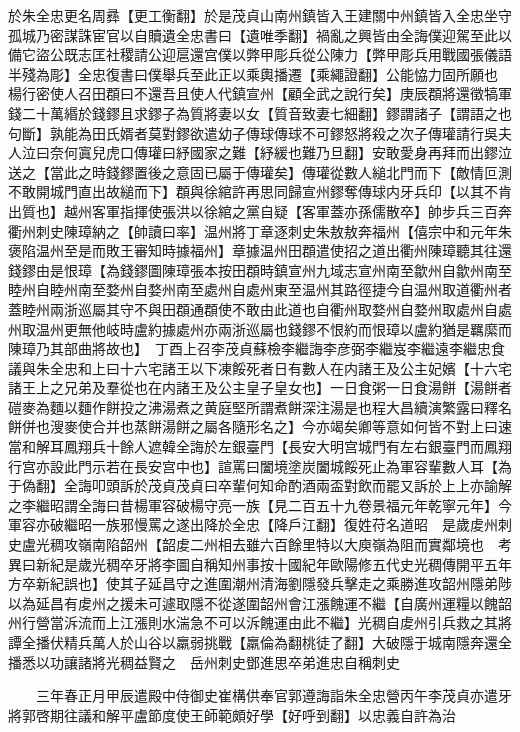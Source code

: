 於朱全忠更名周彞【更工衡翻】於是茂貞山南州鎮皆入王建關中州鎮皆入全忠坐守孤城乃密謀誅宦官以自贖遺全忠書曰【遺唯季翻】禍亂之興皆由全誨僕迎駕至此以備它盜公既志匡社稷請公迎扈還宫僕以弊甲彫兵從公陳力【弊甲彫兵用戰國張儀語半殘為彫】全忠復書曰僕舉兵至此正以乘輿播遷【乘繩證翻】公能恊力固所願也　楊行密使人召田頵曰不還吾且使人代鎮宣州【顧全武之說行矣】庚辰頵將還徵犒軍錢二十萬緡於錢鏐且求鏐子為質將妻以女【質音致妻七細翻】鏐謂諸子【謂語之也句斷】孰能為田氏婿者莫對鏐欲遣幼子傳球傳球不可鏐怒將殺之次子傳瓘請行吳夫人泣曰奈何寘兒虎口傳瓘曰紓國家之難【紓緩也難乃旦翻】安敢愛身再拜而出鏐泣送之【當此之時錢鏐置後之意固已屬于傳瓘矣】傳瓘從數人縋北門而下【敵情叵測不敢開城門直出故縋而下】頵與徐綰許再思同歸宣州鏐奪傳球内牙兵印【以其不肯出質也】越州客軍指揮使張洪以徐綰之黨自疑【客軍蓋亦孫儒散卒】帥步兵三百奔衢州刺史陳璋納之【帥讀曰率】温州將丁章逐刺史朱敖敖奔福州【僖宗中和元年朱褒陷温州至是而敗王審知時據福州】章據温州田頵遣使招之道出衢州陳璋聽其往還錢鏐由是恨璋【為錢鏐圖陳璋張本按田頵時鎮宣州九域志宣州南至歙州自歙州南至睦州自睦州南至婺州自婺州南至處州自處州東至温州其路徑捷今自温州取道衢州者蓋睦州兩浙巡屬其守不與田頵通頵使不敢由此道也自衢州取婺州自婺州取處州自處州取温州更無他岐時盧約據處州亦兩浙巡屬也錢鏐不恨約而恨璋以盧約猶是羈縻而陳璋乃其部曲將故也】　丁酉上召李茂貞蘇檢李繼誨李彦弼李繼岌李繼遠李繼忠食議與朱全忠和上曰十六宅諸王以下凍餒死者日有數人在内諸王及公主妃嬪【十六宅諸王上之兄弟及羣從也在内諸王及公主皇子皇女也】一日食粥一日食湯餅【湯餅者磑麥為麵以麵作餅投之沸湯煮之黄庭堅所謂煮餅深注湯是也程大昌續演繁露曰釋名餅併也溲麥使合并也蒸餅湯餅之屬各隨形名之】今亦竭矣卿等意如何皆不對上曰速當和解耳鳳翔兵十餘人遮韓全誨於左銀臺門【長安大明宫城門有左右銀臺門而鳳翔行宫亦設此門示若在長安宫中也】諠罵曰闔境塗炭闔城餒死止為軍容輩數人耳【為于偽翻】全誨叩頭訴於茂貞茂貞曰卒輩何知命酌酒兩盃對飲而罷又訴於上上亦諭解之李繼昭謂全誨曰昔楊軍容破楊守亮一族【見二百五十九卷景福元年乾寧元年】今軍容亦破繼昭一族邪慢罵之遂出降於全忠【降戶江翻】復姓苻名道昭　是歲䖍州刺史盧光稠攻嶺南陷韶州【韶䖍二州相去雖六百餘里特以大庾嶺為阻而實鄰境也　考異曰新紀是歲光稠卒牙將李圖自稱知州事按十國紀年歐陽修五代史光稠傳開平五年方卒新紀誤也】使其子延昌守之進圍潮州清海劉隱發兵擊走之乘勝進攻韶州隱弟陟以為延昌有䖍州之援未可遽取隱不從遂圍韶州會江漲餽運不繼【自廣州運糧以餽韶州行營當泝流而上江漲則水湍急不可以泝餽運由此不繼】光稠自䖍州引兵救之其將譚全播伏精兵萬人於山谷以羸弱挑戰【羸倫為翻桃徒了翻】大破隱于城南隱奔還全播悉以功讓諸將光稠益賢之　岳州刺史鄧進思卒弟進忠自稱刺史

　　三年春正月甲辰遣殿中侍御史崔構供奉官郭遵誨詣朱全忠營丙午李茂貞亦遣牙將郭啓期往議和解平盧節度使王師範頗好學【好呼到翻】以忠義自許為治

